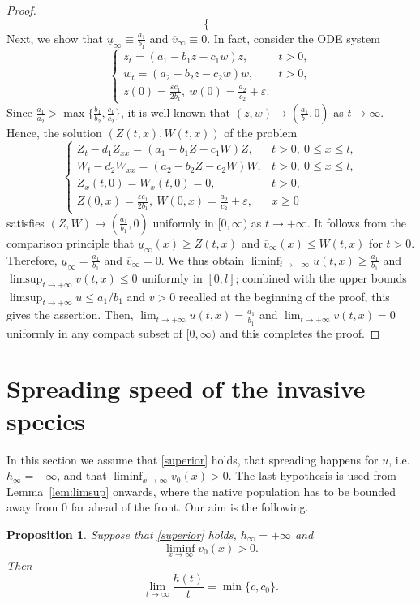 \documentclass[reqno]{amsart}
\newcommand{\rev}[1]{#1}
\theoremstyle{plain}
\newtheorem{proposition}[theorem]{Proposition}
\theoremstyle{definition}
\theoremstyle{remark}
\begin{document}
\begin{proof}
\begin{equation}
\begin{cases}
			\end{cases}
		\end{equation}
		Next, we show that $\underline{u}_{\infty} \equiv \frac{a_1}{b_1}$ and
		$\overline{v}_{\infty} \equiv 0$. In fact, consider the ODE system
		\[
		\begin{cases}
			z_t = (a_1 - b_1z - c_1w)z, & t > 0,\\
			w_t = (a_2 - b_2z - c_2w)w, & t > 0,\\
			z(0) = \frac{\varepsilon c_1}{2b_1},~ w(0) = \frac{a_2}{c_2} + \varepsilon.
		\end{cases}
		\]
		Since $\frac{a_1}{a_2} > \max\{ \frac{b_1}{b_2}, \frac{c_1}{c_2}\}$, it is
		well-known that $(z,w) \to (\frac{a_1}{b_1},0)$ as $t \to \infty$. Hence, the
		solution $(Z(t,x), W(t,x))$ of the problem
		\[
		\begin{cases}
			Z_t - d_1Z_{xx} = (a_1 - b_1Z - c_1W)Z,
			& t > 0, ~0 \leq x \leq l,\\
			W_t - d_2W_{xx} = (a_2 - b_2Z - c_2W)W,
			& t > 0, ~0 \leq x \leq l,\\
			Z_x(t,0) = W_x(t, 0) = 0,
			& t > 0,\\
			Z(0,x) = \frac{\varepsilon c_1}{2b_1},
			~ W(0,x) = \frac{a_2}{c_2} + \varepsilon,
			& x \geq 0
		\end{cases}
		\]
		satisfies $(Z,W) \to (\frac{a_1}{b_1},0)$ uniformly in $[0, \infty)$ as
		$t \to +\infty$. It follows from the comparison principle that
		$\underline{u}_{\infty}(x) \geq Z(t,x)$ and $\overline{v}_{\infty}(x) \leq
		W(t,x)$ for $t > 0$. Therefore, $\underline{u}_{\infty} = \frac{a_1}{b_1}$ and
		$\overline{v}_{\infty} = 0$. We thus obtain $\liminf_{t \to +\infty} u(t,x)
		\geq \frac{a_1}{b_1}$ and $\limsup_{t \to +\infty}v(t,x) \leq 0$ uniformly in
		$[0,l]$\rev{; combined with the upper bounds
		$\limsup_{t\to+\infty}u\le a_1/b_1$ and $v>0$ recalled at the beginning of
		the proof, this gives the assertion}. Then, $\lim_{t\to+\infty}u(t,x) = \frac{a_1}{b_1}$ and
		$\lim_{t\to+\infty}v(t,x) = 0$ uniformly in any compact subset of $[0, \infty)$
		and this completes the proof.
	\end{proof}
	
	\section{Spreading speed of the invasive species}\label{sec_4}
	In this section we assume that \eqref{superior} holds, that spreading happens
	for $u$, i.e. $h_\infty=+\infty$, and that
	$\liminf_{x\to\infty}v_0(x)>0$. The last hypothesis is used from
	Lemma~\ref{lem:limsup} onwards, where the native population has to be bounded away
	from $0$ far ahead of the front. Our aim is the following.
	\begin{proposition}\label{prop:speed}
		Suppose that \eqref{superior} holds, $h_\infty = +\infty$ and
		\[
		\liminf_{x\to\infty} v_0(x) > 0.
		\]
		Then
		\[
		\lim_{t\to\infty} \frac{h(t)}{t} = \min\{c, c_0\}.
		\]
	\end{proposition}
	
\end{document}
